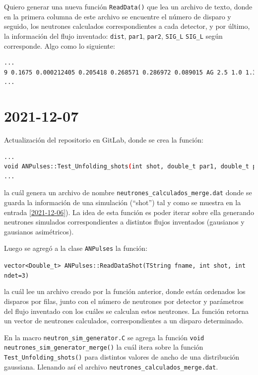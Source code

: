 \documentclass[11pt,letterpaper]{article}
\begin{document}
Quiero generar una nueva función \verb|ReadData()| que lea un archivo de texto, donde en la primera columna de este archivo se encuentre el número de disparo y seguido, los neutrones calculados correspondientes a cada detector, y por último, la información del flujo inventado: \verb|dist|, \verb|par1|, \verb|par2|, \verb|SIG_L| \verb|SIG_L| según corresponde. Algo como lo siguiente:

\begin{lstlisting}[language=bash]
...
9 0.1675 0.000212405 0.205418 0.268571 0.286972 0.089015 AG 2.5 1.0 1.3 0.5	
...
\end{lstlisting}


\section{2021-12-07}
\label{2021-12-07}
Actualización del repositorio en GitLab, donde se crea la función:

\begin{lstlisting}[language=bash]
...
void ANPulses::Test_Unfolding_shots(int shot, double_t par1, double_t par2, TString dist, double_t SIG_L, double_t SIG_R)
...
\end{lstlisting}

la cuál genera un archivo de nombre \verb|neutrones_calculados_merge.dat| donde se guarda la información de una simulación (``shot'') tal y como se muestra en la entrada \ref{2021-12-06}). La idea de esta función es poder iterar sobre ella generando neutrones simulados correspondientes a distintos flujos inventados (gausianos y gausianos asimétricos).


Luego se agregó a la clase \verb|ANPulses| la función:

\verb|vector<Double_t> ANPulses::ReadDataShot(TString fname, int shot, int ndet=3)|

la cuál lee un archivo creado por la función anterior, donde están ordenados los disparos por filas, junto con el número de neutrones por detector y parámetros del flujo inventado con los cuáles se calculan estos neutrones. La función retorna un vector de neutrones calculados, correspondientes a un disparo determinado.  

En la macro \verb|neutron_sim_generator.C| se agrega la función \verb|void neutrones_sim_generator_merge()| la cuál itera sobre la función \verb|Test_Unfolding_shots()| para distintos valores de ancho de una distribución gaussiana. Llenando así el archivo \verb|neutrones_calculados_merge.dat|.
\end{document}
